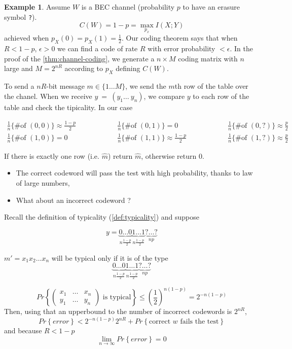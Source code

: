 \documentclass{article}
\theoremstyle{definition} %
\newtheorem{example}{Example}
\renewcommand{\Pr}[1]{Pr\left\{#1\right\}}
\newcommand{\pfrac}[2]{\left( \frac{#1}{#2} \right)}
\begin{document}
\begin{example}
  Assume $W$ is a BEC channel (probability $p$ to have an erasure symbol \texttt{?}).
  \[
    C(W) = 1-p = \max_{p_x} I(X;Y)
  \]
  achieved when $p_X(0)=p_X(1)=\frac 1 2$. Our coding theorem says that when $R<1-p$, $\epsilon > 0$ we can find a code of rate $R$ with error probability $< \epsilon$. In the proof of the \cref{thm:channel-coding}, we generate a $n\times M$ coding matrix with $n$ large and $M=2^{nR}$ according to $p_X$ defining $C(W)$.

  To send a $nR$-bit message $m \in \{1 \dots M\}$, we send the $m$th row of the table over the chanel. When we receive $y~=~(y_1\dots~y_n)$, we compare $y$ to each row of the table and check the tipicality. In our case

  \begin{align*}
    \frac 1 n \{\text{\# of }(0,0)\} \approx \frac {1-p} 2 \hspace{5em}&
    \frac 1 n \{\text{\# of }(0,1)\} = 0 \hspace{5em}&
    \frac 1 n \{\text{\# of }(0,?)\} \approx \frac p 2 \\
    \frac 1 n \{\text{\# of }(1,0)\} = 0 \hspace{5em}&
    \frac 1 n \{\text{\# of }(1,1)\} \approx \frac {1-p} 2 \hspace{5em}&
    \frac 1 n \{\text{\# of }(1,?)\} \approx \frac p 2
  \end{align*}

  If there is exactly one row (i.e. $\hat m$) return $\hat m$, otherwise return $0$.

  \begin{itemize}
    \item The correct codeword will pass the test with high probability, thanks to law of large numbers,
    \item What about an incorrect codeword ?
  \end{itemize}

  Recall the definition of typicality (\cref{def:typicality}) and suppose

  \[
    y = \underbrace{0\dots0}_{n \frac{1-p} 2} \underbrace{1\dots1}_{n \frac{1-p} 2} \underbrace{?\dots?}_{np}
  \]

  $m' = x_1 x_2 \dots x_n$ will be typical only if it is of the type
  \[
    \underbrace{0\dots0}_{n \frac{1-p} 2} \underbrace{1\dots1}_{n \frac{1-p} 2} \underbrace{?\dots?}_{np}
  \]

  \[
    \Pr{
    \begin{pmatrix}
      x_1 & \dots & x_n\\
      y_1 & \dots & y_n
    \end{pmatrix}
    \text{ is typical}
    }
    \leq
    \pfrac 1 2 ^ {n(1-p)} = 2^{-n(1-p)}
  \]
  Then, using that an upperbound to the number of incorrect codewords is $2^{nR}$,
  \[
    \Pr{error} < 2^{-n(1-p)}2^{nR} + \Pr{\text{correct $w$ fails the test}}
  \]
  and because $R < 1-p$
  \[
    \lim_{n\to \infty} \Pr{error} = 0
  \]

\end{example}
\end{document}

